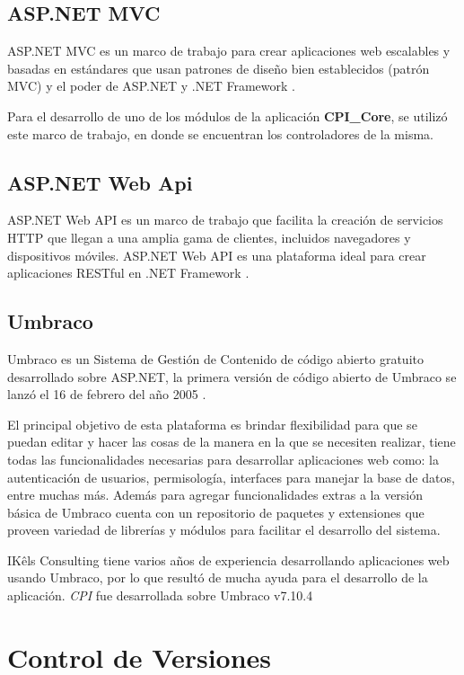 \subsection{ASP.NET MVC}
ASP.NET MVC es un marco de trabajo para crear aplicaciones web escalables y basadas en estándares que usan patrones de diseño bien establecidos (patrón MVC) y el poder de ASP.NET y .NET Framework \cite{aspmvcMicrosoft}.

Para el desarrollo de uno de los módulos de la aplicación \textbf{CPI\_Core}, se utilizó este marco de trabajo, en donde se encuentran los controladores de la misma.

\subsection{ASP.NET Web Api}
ASP.NET Web API es un marco de trabajo que facilita la creación de servicios HTTP que llegan a una amplia gama de clientes, incluidos navegadores y dispositivos móviles. ASP.NET Web API es una plataforma ideal para crear aplicaciones RESTful en .NET Framework \cite{aspWebAPIMicrosoft}.

\subsection{Umbraco}
Umbraco es un Sistema de Gestión de Contenido de código abierto gratuito desarrollado sobre ASP.NET, la primera versión de código abierto de Umbraco se lanzó el 16 de febrero del año 2005 \cite{umbraco}.

El principal objetivo de esta plataforma es brindar flexibilidad para que se puedan editar y hacer las cosas de la manera en la que se necesiten realizar, tiene todas las funcionalidades necesarias para desarrollar aplicaciones web como: la autenticación de usuarios, permisología, interfaces para manejar la base de datos, entre muchas más. Además para agregar funcionalidades extras a la versión básica de Umbraco cuenta con un repositorio de paquetes y extensiones que proveen variedad de librerías y módulos para facilitar el desarrollo del sistema. 

IKêls Consulting \cite{ikels} tiene varios años de experiencia desarrollando aplicaciones web usando Umbraco, por lo que resultó de mucha ayuda para el desarrollo de la aplicación. \textit{CPI} fue desarrollada sobre Umbraco v7.10.4


\section{Control de Versiones}
